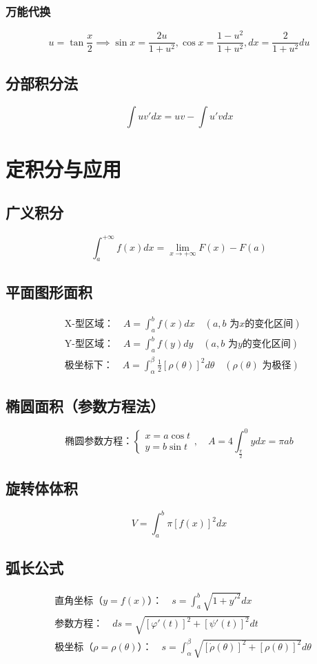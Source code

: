 \documentclass{article}
\begin{document}
\subsubsection{万能代换}
\[
u = \tan\frac{x}{2} \implies \sin x = \frac{2u}{1+u^2}, \cos x = \frac{1-u^2}{1+u^2}, dx = \frac{2}{1+u^2}du
\]

\subsection{分部积分法}
\[
\int uv'dx = uv - \int u'v dx
\]

\section{定积分与应用}
\subsection{广义积分}
\[
\int_{a}^{+\infty} f(x)dx = \lim_{x \to +\infty} F(x) - F(a)
\]

\subsection{平面图形面积}
\[
\begin{aligned}
&\text{X-型区域：} \quad A = \int_{a}^{b} f(x)dx \quad (a,b \text{ 为} x \text{的变化区间}) \\
&\text{Y-型区域：} \quad A = \int_{a}^{b} f(y)dy \quad (a,b \text{ 为} y \text{的变化区间}) \\
&\text{极坐标下：} \quad A = \int_{\alpha}^{\beta} \frac{1}{2}[\rho(\theta)]^2d\theta \quad (\rho(\theta) \text{ 为极径})
\end{aligned}
\]

\subsection{椭圆面积（参数方程法）}
\[
\text{椭圆参数方程：} \begin{cases} x = a\cos t \\ y = b\sin t \end{cases}, \quad A = 4\int_{\frac{\pi}{2}}^{0} ydx = \pi ab
\]

\subsection{旋转体体积}
\[
V = \int_{a}^{b} \pi[f(x)]^2dx
\]

\subsection{弧长公式}
\[
\begin{aligned}
&\text{直角坐标（} y = f(x) \text{）：} \quad s = \int_{a}^{b} \sqrt{1+y'^2}dx \\
&\text{参数方程：} \quad ds = \sqrt{[\varphi'(t)]^2 + [\psi'(t)]^2}dt \\
&\text{极坐标（} \rho = \rho(\theta) \text{）：} \quad s = \int_{\alpha}^{\beta} \sqrt{[\dot{\rho}(\theta)]^2 + [\rho(\theta)]^2}d\theta
\end{aligned}
\]
\end{document}
